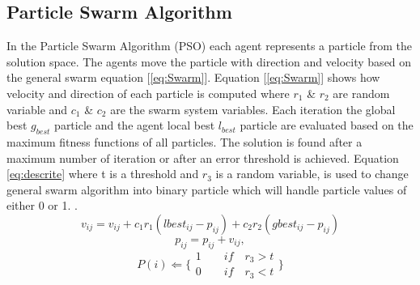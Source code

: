 \documentclass[a4paper,10pt]{IEEEconf}
\begin{document}
\subsection{Particle Swarm Algorithm}
\label{PSO}
In the Particle Swarm Algorithm (PSO) each agent represents a particle from the solution space. The agents move the particle with direction and velocity based on the general swarm equation [\ref{eq:Swarm}]. Equation [\ref{eq:Swarm}] shows how velocity and direction of each particle is computed where $r_1$ \& $r_2$ are random variable and $c_1$ \& $c_2$ are the swarm system variables. Each iteration the global best $g_{best}$ particle and  the agent local best $l_{best}$ particle are evaluated based on the maximum fitness functions of  all particles. The solution is found after a maximum number of iteration or after an error threshold is achieved. Equation \ref{eq:descrite} where t is a threshold and $r_{3}$  is a random variable, is used to change general swarm algorithm into binary particle which will handle particle values of either 0 or 1. .  
\begin{equation}
v_{ij}  = v_{ij}  + c_1 r_1 (lbest_{ij}  - p_{ij} ) + c_2 r_2 (gbest_{ij}  - p_{ij} )
\label{eq:Swarm}
\end{equation}
\begin{equation}
p_{ij}=p_{ij}+v_{ij},
\end{equation}
\begin{equation}
   P(i)\Leftarrow 
\{
\begin{array}{c} 
1 \quad \quad if\quad r_{3}>t  \\

0 \quad \quad if\quad r_{3}<t 
\label{eq:descrite}
\end{array}\}
\end{equation}
\end{document}
